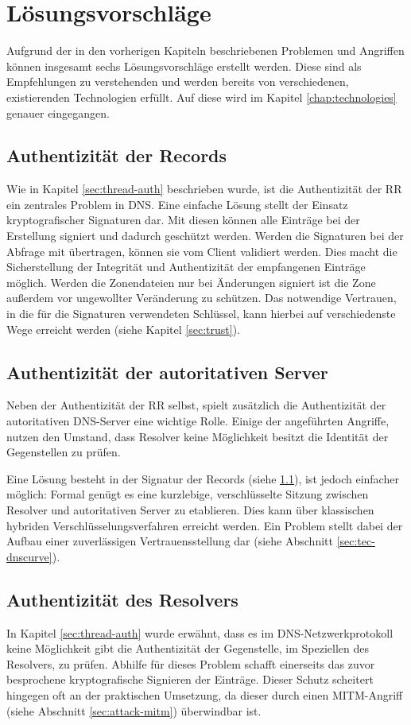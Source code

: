 \chapter{Lösungsvorschläge}
\label{chap:solutions}
Aufgrund der in den vorherigen Kapiteln beschriebenen Problemen und Angriffen können insgesamt sechs Lösungsvorschläge erstellt werden. Diese sind als Empfehlungen zu verstehenden und werden bereits von verschiedenen, existierenden Technologien erfüllt. Auf diese wird im Kapitel \ref{chap:technologies} genauer eingegangen.

\section{Authentizität der Records}
\label{sec:solution-recordauth}
Wie in Kapitel \ref{sec:thread-auth} beschrieben wurde, ist die Authentizität der \ac{RR} ein zentrales Problem in DNS. Eine einfache Lösung stellt der Einsatz kryptografischer Signaturen dar. Mit diesen können alle Einträge bei der Erstellung signiert und dadurch geschützt werden. Werden die Signaturen bei der Abfrage mit übertragen, können sie vom Client validiert werden. Dies macht die Sicherstellung der Integrität und Authentizität der empfangenen Einträge möglich. Werden die Zonendateien nur bei Änderungen signiert ist die Zone außerdem vor ungewollter Veränderung zu schützen. Das notwendige Vertrauen, in die für die Signaturen verwendeten Schlüssel, kann hierbei auf verschiedenste Wege erreicht werden (siehe Kapitel \ref{sec:trust}).

\section{Authentizität der autoritativen Server}
Neben der Authentizität der RR selbst, spielt zusätzlich die Authentizität der autoritativen DNS-Server eine wichtige Rolle. Einige der angeführten Angriffe, nutzen den Umstand, dass Resolver keine Möglichkeit besitzt die Identität der Gegenstellen zu prüfen. 

Eine Lösung besteht in der Signatur der Records (siehe \ref{sec:solution-recordauth}), ist jedoch einfacher möglich: Formal genügt es eine kurzlebige, verschlüsselte Sitzung zwischen Resolver und autoritativen Server zu etablieren. Dies kann über klassischen hybriden Verschlüsselungsverfahren erreicht werden. Ein Problem stellt dabei der Aufbau einer zuverlässigen Vertrauensstellung dar (siehe Abschnitt \ref{sec:tec-dnscurve}).

\section{Authentizität des Resolvers}
In Kapitel \ref{sec:thread-auth} wurde erwähnt, dass es im DNS-Netzwerkprotokoll keine Möglichkeit gibt die Authentizität der Gegenstelle, im Speziellen des Resolvers, zu prüfen. Abhilfe für dieses Problem schafft einerseits das zuvor besprochene kryptografische Signieren der Einträge. Dieser Schutz scheitert hingegen oft an der praktischen Umsetzung, da dieser durch einen MITM-Angriff (siehe Abschnitt \ref{sec:attack-mitm}) überwindbar ist\cite{Bau2010}. 


